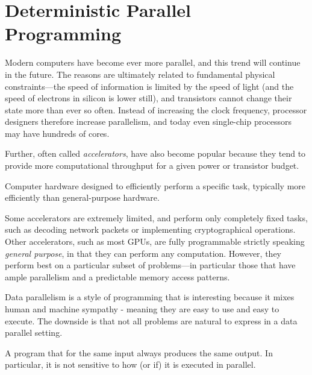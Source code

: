 \chapter{Deterministic Parallel Programming}

Modern computers have become ever more parallel, and this trend will
continue in the future. The reasons are ultimately related to
fundamental physical constraints---the speed of information is limited
by the speed of light (and the speed of electrons in silicon is lower
still), and transistors cannot change their state more than ever so
often. Instead of increasing the clock frequency, processor designers
therefore increase parallelism, and today even single-chip processors
may have hundreds of cores.

Further, often called \emph{accelerators}, have also become popular
because they tend to provide more computational throughput for a given
power or transistor budget.

\begin{definition}[Accelerator]
  Computer hardware designed to efficiently perform a specific task,
  typically more efficiently than general-purpose hardware.
\end{definition}

Some accelerators are extremely limited, and perform only completely
fixed tasks, such as decoding network packets or implementing
cryptographical operations. Other accelerators, such as most GPUs, are
fully programmable strictly speaking \emph{general purpose}, in that
they can perform any computation. However, they perform best on a
particular subset of problems---in particular those that have ample
parallelism and a predictable memory access patterns.

Data parallelism is a style of programming that is interesting because
it mixes human and machine sympathy - meaning they are easy to use and
easy to execute. The downside is that not all problems are natural to
express in a data parallel setting.

\begin{definition}
  A program that for the same input always produces the same output.
  In particular, it is not sensitive to how (or if) it is executed in
  parallel.
\end{definition}


